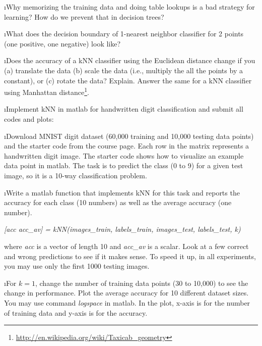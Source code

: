 \documentclass[fleqn]{article}
\begin{document}
\i Why memorizing the training data and doing table lookups is a bad strategy for learning? How do we prevent that in decision trees?

\i What does the decision boundary of 1-nearest neighbor classifier for 2 points (one positive, one negative) look like?

\i Does the accuracy of a kNN classifier using the Euclidean distance change if you (a) translate the data (b) scale the data (i.e., multiply the all the points by a constant), or (c) rotate the data? Explain. Answer the same for a kNN classifier using Manhattan distance\footnote{\url{http://en.wikipedia.org/wiki/Taxicab_geometry}}. 

\i Implement kNN in matlab for handwritten digit classification and submit all codes and plots:

\bee
\i Download MNIST digit dataset (60,000 training and 10,000 testing data points) and the starter code from the course page. Each row in the matrix represents a handwritten digit image. The starter code shows how to visualize an example data point in matlab. The task is to predict the class (0 to 9) for a given test image, so it is a 10-way classification problem. 



\i Write a matlab function that implements kNN for this task and reports the accuracy for each class (10 numbers) as well as the average accuracy (one number).

{\em [acc acc\_av] = kNN(images\_train, labels\_train, images\_test, labels\_test, k)}

where {\em acc} is a vector of length 10 and {\em acc\_av} is a scalar. Look at a few correct and wrong predictions to see if it makes sense. To speed it up, in all experiments, you may use only the first 1000 testing images.

\i For $k=1$, change the number of training data points (30 to 10,000) to see the change in performance. Plot the average accuracy for 10 different dataset sizes. You may use command {\em logspace} in matlab. In the plot, x-axis is for the number of training data and y-axis is for the accuracy.
\end{document}
